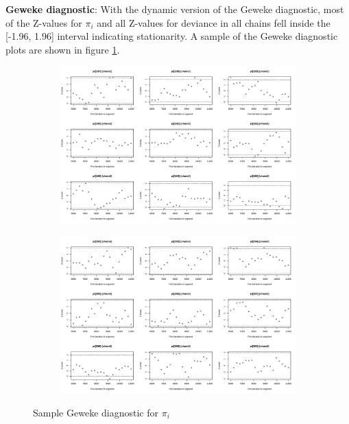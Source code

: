 \documentclass[12pt]{article}
\begin{document}
\textbf{Geweke diagnostic}: With the dynamic version of the Geweke diagnostic, most of the Z-values for $\pi_i$ and all Z-values for deviance in all chains fell inside the [-1.96, 1.96] interval indicating stationarity. A sample of the Geweke diagnostic plots are shown in figure \ref{fig:gewekem1}. 

\begin{figure}[h!]
    \centering
    \begin{subfigure}{0.45\textwidth}
        \includegraphics[width=\linewidth]{pictures/geweke187-195.png}
    \end{subfigure}
    \begin{subfigure}{0.45\textwidth}
        \includegraphics[width=\linewidth]{pictures/geweke292-300.png}
    \end{subfigure}
    
    \caption{Sample Geweke diagnostic for $\pi_i$}
    \label{fig:gewekem1}
\end{figure}
\end{document}
